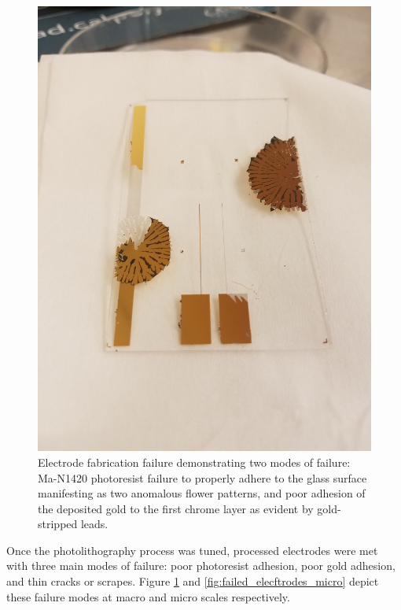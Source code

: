 \begin{figure}[h]
    \centering
    \includegraphics[width=\textwidth]{images/adhesion_issues.jpg}
    \caption{Electrode fabrication failure demonstrating two modes of failure: Ma-N1420 photoresist failure to properly adhere to the glass surface manifesting as two anomalous flower patterns, and poor adhesion of the deposited gold to the first chrome layer as evident by gold-stripped leads.}
    \label{fig:failed_electrode_macro}
\end{figure}

\par Once the photolithography process was tuned, processed electrodes were met with three main modes of failure: poor photoresist adhesion, poor gold adhesion, and thin cracks or scrapes. Figure \ref{fig:failed_electrode_macro} and \ref{fig:failed_elecftrodes_micro}  depict these failure modes at macro and micro scales respectively.

